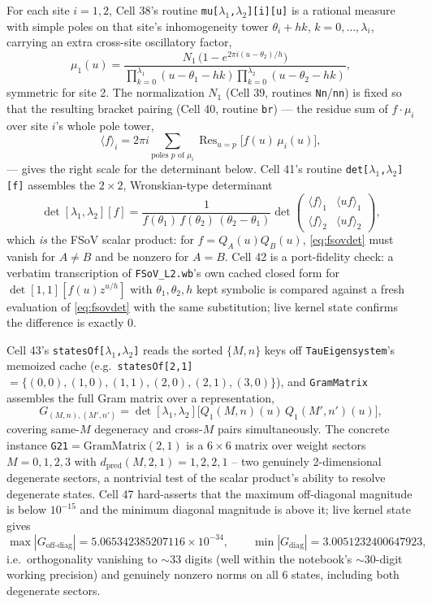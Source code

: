 \documentclass[11pt]{article}
\begin{document}
For each site $i=1,2$, Cell 38's routine \texttt{mu[$\lambda_1$,$\lambda_2$][i][u]} is a rational
measure with simple poles on that site's inhomogeneity tower $\theta_i+hk$,
$k=0,\dots,\lambda_i$, carrying an extra cross-site oscillatory factor,
\[
  \mu_1(u) = \frac{N_1\,\bigl(1-e^{2\pi i(u-\theta_2)/h}\bigr)}
                  {\prod_{k=0}^{\lambda_1}(u-\theta_1-hk)\prod_{k=0}^{\lambda_2}(u-\theta_2-hk)},
\]
symmetric for site 2. The normalization $N_1$ (Cell 39, routines \texttt{Nn}/\texttt{nn}) is fixed
so that the resulting bracket pairing (Cell 40, routine \texttt{br}) --- the residue sum of
$f\cdot\mu_i$ over site $i$'s whole pole tower,
\[
  \langle f\rangle_i = 2\pi i \sum_{\text{poles } p \text{ of } \mu_i}\operatorname{Res}_{u=p}\bigl[f(u)\,\mu_i(u)\bigr],
\]
--- gives the right scale for the determinant below. Cell 41's routine
\texttt{det[$\lambda_1$,$\lambda_2$][f]} assembles the $2\times2$, Wronskian-type determinant
\begin{equation}
  \det[\lambda_1,\lambda_2][f] = \frac{1}{f(\theta_1)\,f(\theta_2)\,(\theta_2-\theta_1)}
  \det\begin{pmatrix} \langle f\rangle_1 & \langle uf\rangle_1 \\ \langle f\rangle_2 & \langle uf\rangle_2 \end{pmatrix},
  \label{eq:fsovdet}
\end{equation}
which \emph{is} the FSoV scalar product: for $f=Q_A(u)Q_B(u)$, \eqref{eq:fsovdet} must vanish for
$A\neq B$ and be nonzero for $A=B$. Cell 42 is a port-fidelity check: a verbatim transcription of
\texttt{FSoV\_L2.wb}'s own cached closed form for $\det[1,1][f(u)z^{u/h}]$ with $\theta_1,\theta_2,h$
kept symbolic is compared against a fresh evaluation of \eqref{eq:fsovdet} with the same
substitution; live kernel state confirms the difference is exactly $0$.

Cell 43's \texttt{statesOf[$\lambda_1$,$\lambda_2$]} reads the sorted $\{M,n\}$ keys off
\texttt{TauEigensystem}'s memoized cache (e.g.\ \texttt{statesOf[2,1]} $=\{(0,0),(1,0),(1,1),(2,0),
(2,1),(3,0)\}$), and \texttt{GramMatrix} assembles the full Gram matrix over a representation,
\begin{equation}
  G_{(M,n),(M',n')} = \det[\lambda_1,\lambda_2]\bigl[Q_1(M,n)(u)\,Q_1(M',n')(u)\bigr],
  \label{eq:gram}
\end{equation}
covering same-$M$ degeneracy and cross-$M$ pairs simultaneously. The concrete instance
\texttt{G21}$=\mathrm{GramMatrix}(2,1)$ is a $6\times6$ matrix over weight sectors
$M=0,1,2,3$ with $d_{\mathrm{pred}}(M,2,1)=1,2,2,1$ -- two genuinely 2-dimensional degenerate
sectors, a nontrivial test of the scalar product's ability to resolve degenerate states. Cell 47
hard-asserts that the maximum off-diagonal magnitude is below $10^{-15}$ and the minimum diagonal
magnitude is above it; live kernel state gives
\[
  \max|G_{\text{off-diag}}| = 5.065342385207116\times10^{-34}, \qquad
  \min|G_{\text{diag}}| = 3.0051232400647923,
\]
i.e.\ orthogonality vanishing to $\sim33$ digits (well within the notebook's $\sim30$-digit working
precision) and genuinely nonzero norms on all 6 states, including both degenerate sectors.
\end{document}
